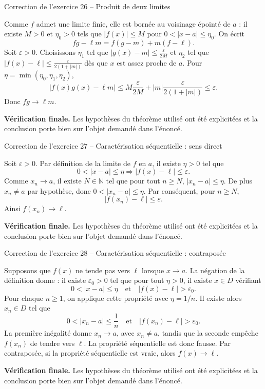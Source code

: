 \documentclass[11pt,a4paper]{article}
\newcommand{\N}{\mathbb{N}}
\begin{document}
\begin{corrbox}{Correction de l'exercice 26 -- Produit de deux limites}

Comme $f$ admet une limite finie, elle est bornée au voisinage épointé de $a$ : il existe $M>0$ et $\eta_0>0$ tels que $|f(x)|\leq M$ pour $0<|x-a|\leq\eta_0$. On écrit
\[
fg-\ell m=f(g-m)+m(f-\ell).
\]
Soit $\varepsilon>0$. Choisissons $\eta_1$ tel que $|g(x)-m|\leq \frac{\varepsilon}{2M}$ et $\eta_2$ tel que $|f(x)-\ell|\leq \frac{\varepsilon}{2(1+|m|)}$ dès que $x$ est assez proche de $a$. Pour $\eta=\min(\eta_0,\eta_1,\eta_2)$,
\[
|f(x)g(x)-\ell m|\leq M\frac{\varepsilon}{2M}+|m|\frac{\varepsilon}{2(1+|m|)}\leq\varepsilon.
\]
Donc $fg\to\ell m$.

\medskip
\textbf{Vérification finale.} Les hypothèses du théorème utilisé ont été explicitées et la conclusion porte bien sur l'objet demandé dans l'énoncé.
\end{corrbox}


\begin{corrbox}{Correction de l'exercice 27 -- Caractérisation séquentielle : sens direct}

Soit $\varepsilon>0$. Par définition de la limite de $f$ en $a$, il existe $\eta>0$ tel que
\[
0<|x-a|\leq\eta\Longrightarrow |f(x)-\ell|\leq\varepsilon.
\]
Comme $x_n\to a$, il existe $N\in\N$ tel que pour tout $n\geq N$, $|x_n-a|\leq\eta$. De plus $x_n\neq a$ par hypothèse, donc $0<|x_n-a|\leq\eta$. Par conséquent, pour $n\geq N$,
\[
|f(x_n)-\ell|\leq\varepsilon.
\]
Ainsi $f(x_n)\to\ell$.

\medskip
\textbf{Vérification finale.} Les hypothèses du théorème utilisé ont été explicitées et la conclusion porte bien sur l'objet demandé dans l'énoncé.
\end{corrbox}


\begin{corrbox}{Correction de l'exercice 28 -- Caractérisation séquentielle : contraposée}

Supposons que $f(x)$ ne tende pas vers $\ell$ lorsque $x\to a$. La négation de la définition donne : il existe $\varepsilon_0>0$ tel que pour tout $\eta>0$, il existe $x\in D$ vérifiant
\[
0<|x-a|\leq\eta\quad\text{et}\quad |f(x)-\ell|>\varepsilon_0.
\]
Pour chaque $n\geq1$, on applique cette propriété avec $\eta=1/n$. Il existe alors $x_n\in D$ tel que
\[
0<|x_n-a|\leq\frac1n\quad\text{et}\quad |f(x_n)-\ell|>\varepsilon_0.
\]
La première inégalité donne $x_n\to a$, avec $x_n\neq a$, tandis que la seconde empêche $f(x_n)$ de tendre vers $\ell$. La propriété séquentielle est donc fausse. Par contraposée, si la propriété séquentielle est vraie, alors $f(x)\to\ell$.

\medskip
\textbf{Vérification finale.} Les hypothèses du théorème utilisé ont été explicitées et la conclusion porte bien sur l'objet demandé dans l'énoncé.
\end{corrbox}
\end{document}

